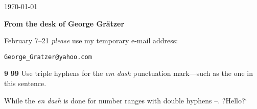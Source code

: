 \documentclass{sample}
\begin{document}
\begin{flushright}
    \today
\end{flushright}
\textbf{From the desk of George Gr\"atzer}

February 7--21 \emph{please} use my temporary e-mail address:
\begin{center}
    \texttt{George\_Gratzer@yahoo.com}
\end{center}

\textbf9
\textbf{99}
Use triple hyphens for the \emph{em dash} punctuation mark---such as the one in this sentence.

While the \emph{en dash} is done for number ranges with double hyphens --.
?Hello?`
\end{document}
